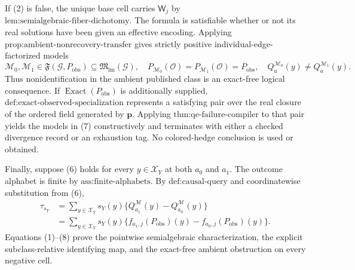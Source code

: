 If (2) is false, the unique base cell carries \(\mathsf W_j\) by \(\text{lem:semialgebraic-fiber-dichotomy}\). The formula is satisfiable whether or not its real solutions have been given an effective encoding. Applying \(\text{prop:ambient-nonrecovery-transfer}\) gives strictly positive individual-edge-factorized models
\[
\mathcal M_0,\mathcal M_1\in\mathfrak F(\mathcal G,P_{\mathrm{obs}})
\subseteq\mathfrak M_{\mathrm{lm}}(\mathcal G),
\quad
P_{\mathcal M_0}(\mathcal O)=P_{\mathcal M_1}(\mathcal O)=P_{\mathrm{obs}},
\quad
Q_a^{\mathcal M_0}(y)\neq Q_a^{\mathcal M_1}(y).
\tag{7}
\]
Thus nonidentification in the ambient published class is an exact-free logical consequence. If \(\operatorname{Exact}(P_{\mathrm{obs}})\) is additionally supplied, \(\text{def:exact-observed-specialization}\) represents a satisfying pair over the real closure of the ordered field generated by \(\mathbf p\). Applying \(\text{thm:qe-failure-compiler}\) to that pair yields the models in (7) constructively and terminates with either a checked divergence record or an exhaustion tag. No colored-hedge conclusion is used or obtained.

Finally, suppose (6) holds for every \(y\in\mathcal X_Y\) at both \(a_0\) and \(a_1\). The outcome alphabet is finite by \(\text{ass:finite-alphabets}\). By \(\text{def:causal-query}\) and coordinatewise substitution from (6),
\[
\begin{aligned}
\tau_{s_Y}
&=\sum_{y\in\mathcal X_Y}s_Y(y)
\{Q_{a_1}^{\mathcal M}(y)-Q_{a_0}^{\mathcal M}(y)\}\\
&=\sum_{y\in\mathcal X_Y}s_Y(y)
\{f_{a_1,j}(P_{\mathrm{obs}})(y)-f_{a_0,j}(P_{\mathrm{obs}})(y)\}.
\end{aligned}
\tag{8}
\]
Equations (1)--(8) prove the pointwise semialgebraic characterization, the explicit subclass-relative identifying map, and the exact-free ambient obstruction on every negative cell.